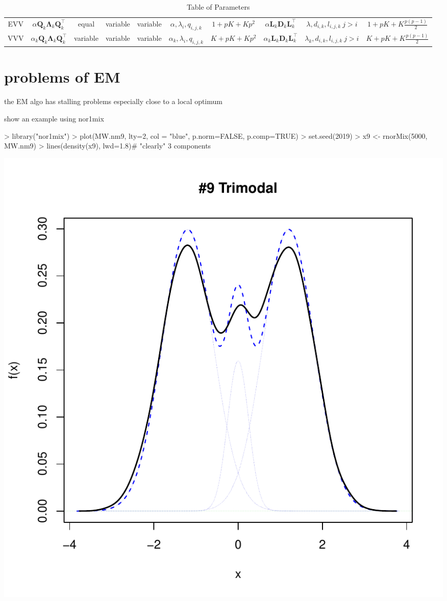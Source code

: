 \begin{table}[!htb]
{\begin{tabular}{| c | c c c c c c | c c c |}
        \hline
        EVV    & $ \alpha \pmb{Q}_k \pmb{\Lambda}_k \pmb{Q}_k^\top $ & equal & variable & variable & $ \alpha, \lambda_{i}, q_{i,j,k} $ & $ 1+pK+Kp^2 $ & $ \alpha \pmb{L}_k \pmb{D}_k \pmb{L}_k^\top $ & $ \lambda, d_{i,k}, l_{i,j,k}\ j>i $ & $ 1+pK+K\frac{p(p-1)}{2} $ \\
        VVV    & $ \alpha_k \pmb{Q}_k \pmb{\Lambda}_k \pmb{Q}_k^\top $ & variable & variable & variable & $ \alpha_k, \lambda_{i}, q_{i,j,k} $ & $ K+pK+Kp^2 $ & $ \alpha_k \pmb{L}_k \pmb{D}_k \pmb{L}_k^\top $ & $ \lambda_k, d_{i,k}, l_{i,j,k}\ j>i $ & $ K+pK+K\frac{p(p-1)}{2} $ \\
        \hline
    \end{tabular}

    \label{table:1}

}

\caption{Table of Parameters}

\end{table}


\clearpage

\section{problems of EM}


the EM algo has stalling problems especially close to a local optimum

show an example using nor1mix


\begin{Schunk}
\begin{Sinput}
> library("nor1mix")
> plot(MW.nm9, lty=2, col = "blue", p.norm=FALSE, p.comp=TRUE)
> set.seed(2019)
> x9 <- rnorMix(5000, MW.nm9)
> lines(density(x9), lwd=1.8)# "clearly" 3 components
\end{Sinput}
\end{Schunk}
\includegraphics{chapter1-001}


